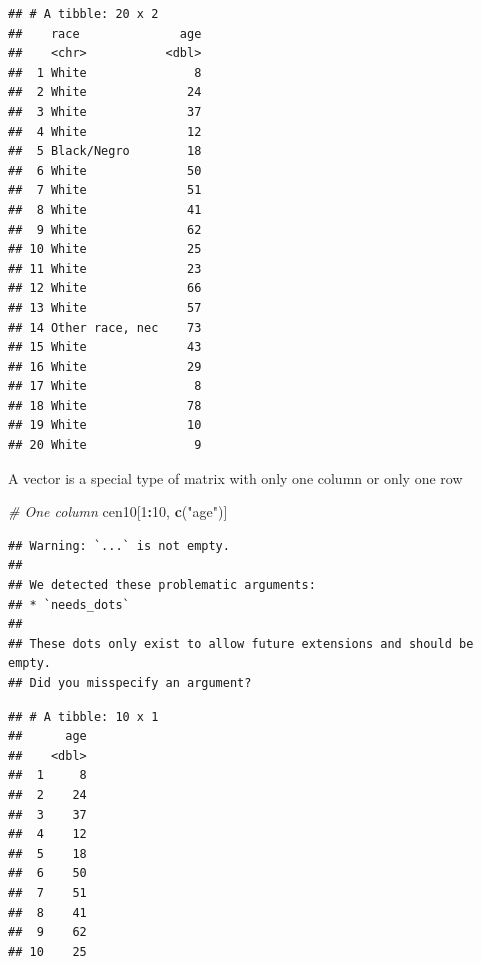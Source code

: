 \documentclass[
]{book}
\newenvironment{Shaded}{\begin{snugshade}}{\end{snugshade}}
\newcommand{\CommentTok}[1]{\textcolor[rgb]{0.56,0.35,0.01}{\textit{#1}}}
\newcommand{\DecValTok}[1]{\textcolor[rgb]{0.00,0.00,0.81}{#1}}
\newcommand{\KeywordTok}[1]{\textcolor[rgb]{0.13,0.29,0.53}{\textbf{#1}}}
\newcommand{\NormalTok}[1]{#1}
\newcommand{\OperatorTok}[1]{\textcolor[rgb]{0.81,0.36,0.00}{\textbf{#1}}}
\newcommand{\StringTok}[1]{\textcolor[rgb]{0.31,0.60,0.02}{#1}}
\theoremstyle{definition}
\theoremstyle{definition}
\theoremstyle{definition}
\theoremstyle{definition}
\theoremstyle{remark}
\begin{document}
\begin{Shaded}
\end{Shaded}

\begin{verbatim}
## # A tibble: 20 x 2
##    race              age
##    <chr>           <dbl>
##  1 White               8
##  2 White              24
##  3 White              37
##  4 White              12
##  5 Black/Negro        18
##  6 White              50
##  7 White              51
##  8 White              41
##  9 White              62
## 10 White              25
## 11 White              23
## 12 White              66
## 13 White              57
## 14 Other race, nec    73
## 15 White              43
## 16 White              29
## 17 White               8
## 18 White              78
## 19 White              10
## 20 White               9
\end{verbatim}

A vector is a special type of matrix with only one column or only one row

\begin{Shaded}
\begin{Highlighting}[]
\CommentTok{# One column}
\NormalTok{cen10[}\DecValTok{1}\OperatorTok{:}\DecValTok{10}\NormalTok{, }\KeywordTok{c}\NormalTok{(}\StringTok{"age"}\NormalTok{)]}
\end{Highlighting}
\end{Shaded}

\begin{verbatim}
## Warning: `...` is not empty.
## 
## We detected these problematic arguments:
## * `needs_dots`
## 
## These dots only exist to allow future extensions and should be empty.
## Did you misspecify an argument?
\end{verbatim}

\begin{verbatim}
## # A tibble: 10 x 1
##      age
##    <dbl>
##  1     8
##  2    24
##  3    37
##  4    12
##  5    18
##  6    50
##  7    51
##  8    41
##  9    62
## 10    25
\end{verbatim}

\begin{Shaded}
\end{Shaded}
\end{document}
